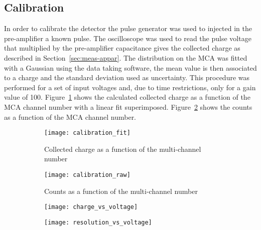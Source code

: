 \subsection{Calibration}
\label{sec:calibration}
In order to calibrate the detector the pulse generator was used to injected in
the pre-amplifier a known pulse. The oscilloscope was used to read the pulse
voltage that multiplied by the pre-amplifier capacitance gives the collected
charge as described in Section~\ref{sec:meas-appar}. The distribution on the MCA
was fitted with a Gaussian using the data taking software, the mean value is
then associated to a charge and the standard deviation used as uncertainty. This
procedure was performed for a set of input voltages and, due to time
restrictions, only for a gain value of 100. Figure~\ref{fig:calibration_fit}
shows the calculated collected charge as a function of the MCA channel number
with a linear fit superimposed. Figure~\ref{fig:calibration_raw} shows the
counts as a function of the MCA channel number.
\begin{figure}[!h]
  \centering
  \begin{subfigure}[t]{.48\linewidth}
    \texttt{[image: calibration\_fit]}
    \caption{Collected charge as a function of the multi-channel number}
    \label{fig:calibration_fit}
  \end{subfigure}
  \begin{subfigure}[t]{.48\linewidth}
    \texttt{[image: calibration\_raw]}
    \caption{Counts as a function of the multi-channel number}
    \label{fig:calibration_raw}
  \end{subfigure}
  \caption{}
  \label{fig:calibration}
\end{figure}

\begin{figure}[!h]
  \centering
  \begin{subfigure}[t]{.48\linewidth}
    \texttt{[image: charge\_vs\_voltage]}
    \caption{}
    \label{fig:charge_vs_voltage}
  \end{subfigure}
  \begin{subfigure}[t]{.48\linewidth}
    \texttt{[image: resolution\_vs\_voltage]}
    \caption{}
    \label{fig:resolution_vs_voltage}
  \end{subfigure}
  \caption{}
  \label{fig:results}
\end{figure}
